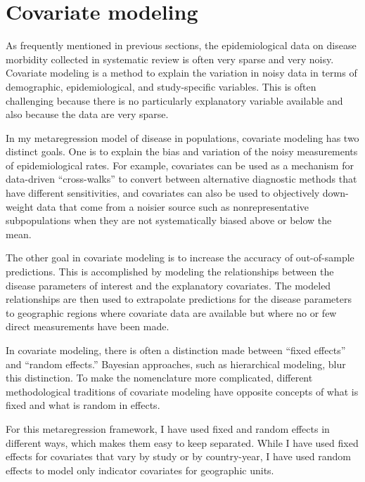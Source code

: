 \chapter{Covariate modeling}
\label{theory-covariate_modeling}
As frequently mentioned in previous sections, the
epidemiological data on disease morbidity collected in systematic
review is often very sparse and very noisy.
Covariate modeling is a method to explain the variation in noisy data
in terms of demographic, epidemiological, and study-specific
variables.  This is often challenging because there is no particularly
explanatory variable available and also because the data are very
sparse.


In my metaregression model of disease in populations, covariate
modeling has two distinct goals.  One is to
explain the bias and variation of the noisy measurements of
epidemiological rates.  For example, covariates can be used as a mechanism
for data-driven ``cross-walks'' to convert between alternative diagnostic methods
that have different sensitivities, and covariates can also be used to
objectively down-weight data that come from a noisier source such as
nonrepresentative subpopulations when they are not systematically
biased above or below the mean.

The other goal in covariate modeling is
to increase the accuracy of out-of-sample predictions.  This
is accomplished by modeling the relationships between the disease
parameters of interest and the explanatory covariates. The modeled
relationships are then used to extrapolate predictions for the disease
parameters to geographic regions where covariate data are available
but where no or few direct measurements have been made.

In covariate modeling, there is often a distinction made between
``fixed effects'' and ``random effects.''  Bayesian approaches, such
as hierarchical modeling, blur this distinction. To make the nomenclature more
complicated, different methodological traditions of covariate modeling
have opposite concepts of what is fixed and what is random in effects.

For this metaregression framework, I have used fixed and
random effects in different ways, which makes them easy to keep
separated.  While I have used fixed effects for covariates that vary
by study or by country-year, I have used random effects to model only
indicator covariates for geographic units.

